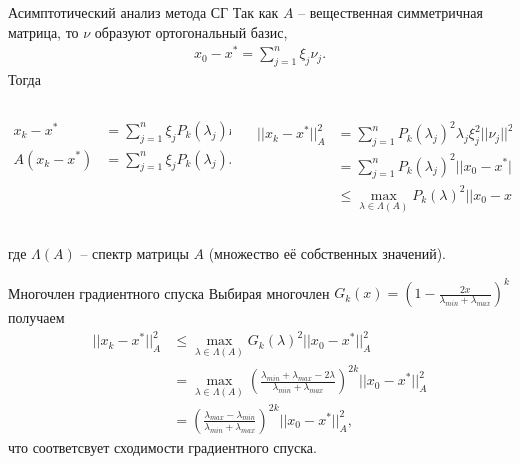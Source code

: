 \documentclass[10pt]{beamer}
\begin{document}
\begin{frame}{Асимптотический анализ метода СГ}
Так как $A$ -- вещественная симметричная матрица, то $\nu$ образуют ортогональный базис, 
\begin{align*}
x_0-x^*=\sum_{j=1}^n\xi_j\nu_j.
\end{align*}
\pause
Тогда 
\begin{columns}
\begin{column}{.4\textwidth}
\begin{align*}
x_k-x^*&=\sum_{j=1}^n\xi_jP_k(\lambda_j)\nu_j\\
A(x_k-x^*)&=\sum_{j=1}^n\xi_jP_k(\lambda_j)\lambda_j\nu_j\\
\end{align*}
\end{column}
\pause
\begin{column}{.6\textwidth}
\begin{align*}
||x_k-x^*||_A^2&=\sum_{j=1}^nP_k(\lambda_j)^2\lambda_j\xi_j^2||\nu_j||^2\\
&=\sum_{j=1}^nP_k(\lambda_j)^2||x_0-x^*||^2_A\\
&\leq \max_{\lambda\in \Lambda(A)}P_k(\lambda)^2||x_0-x^*||^2_A,
\end{align*}
\end{column}
\end{columns}
где $\Lambda(A)$ -- спектр матрицы $A$ (множество её собственных значений).
\end{frame}

\begin{frame}{Многочлен градиентного спуска}
Выбирая многочлен $G_k(x)=\left(1-\frac{2x}{\lambda_{min}+\lambda_{max}}\right)^k$ получаем
\begin{align*}
||x_k-x^*||_A^2&\leq \max_{\lambda\in \Lambda(A)}G_k(\lambda)^2||x_0-x^*||^2_A\\
&=\max_{\lambda\in \Lambda(A)}\left(\frac{\lambda_{min}+\lambda_{max}-2\lambda}{\lambda_{min}+\lambda_{max}}\right)^{2k}||x_0-x^*||^2_A\\
&=\left(\frac{\lambda_{max}-\lambda_{min}}{\lambda_{min}+\lambda_{max}}\right)^{2k}||x_0-x^*||^2_A,
\end{align*}
что соответсвует сходимости градиентного спуска.\\
\end{frame}
\end{document}
